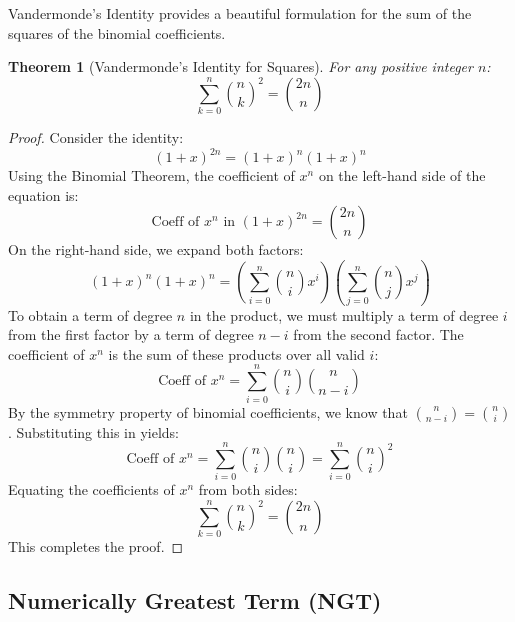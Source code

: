 \documentclass[10pt,journal,compsoc,onecolumn]{IEEEtran}
\newtheorem{theorem}{Theorem}
\begin{document}
Vandermonde's Identity provides a beautiful formulation for the sum of the squares of the binomial coefficients.

\begin{theorem}[Vandermonde's Identity for Squares]
For any positive integer $n$:
\begin{equation}
\sum_{k=0}^{n} \binom{n}{k}^2 = \binom{2n}{n}
\end{equation}
\end{theorem}

\begin{proof}
Consider the identity:
\begin{equation}
(1+x)^{2n} = (1+x)^n (1+x)^n
\end{equation}
Using the Binomial Theorem, the coefficient of $x^n$ on the left-hand side of the equation is:
\begin{equation}
\text{Coeff of } x^n \text{ in } (1+x)^{2n} = \binom{2n}{n}
\end{equation}
On the right-hand side, we expand both factors:
\begin{equation}
(1+x)^n (1+x)^n = \left( \sum_{i=0}^{n} \binom{n}{i} x^i \right) \left( \sum_{j=0}^{n} \binom{n}{j} x^j \right)
\end{equation}
To obtain a term of degree $n$ in the product, we must multiply a term of degree $i$ from the first factor by a term of degree $n-i$ from the second factor. The coefficient of $x^n$ is the sum of these products over all valid $i$:
\begin{equation}
\text{Coeff of } x^n = \sum_{i=0}^{n} \binom{n}{i} \binom{n}{n-i}
\end{equation}
By the symmetry property of binomial coefficients, we know that $\binom{n}{n-i} = \binom{n}{i}$. Substituting this in yields:
\begin{equation}
\text{Coeff of } x^n = \sum_{i=0}^{n} \binom{n}{i} \binom{n}{i} = \sum_{i=0}^{n} \binom{n}{i}^2
\end{equation}
Equating the coefficients of $x^n$ from both sides:
\begin{equation}
\sum_{k=0}^{n} \binom{n}{k}^2 = \binom{2n}{n}
\end{equation}
This completes the proof.
\end{proof}

\subsection{Numerically Greatest Term (NGT)}
\end{document}
